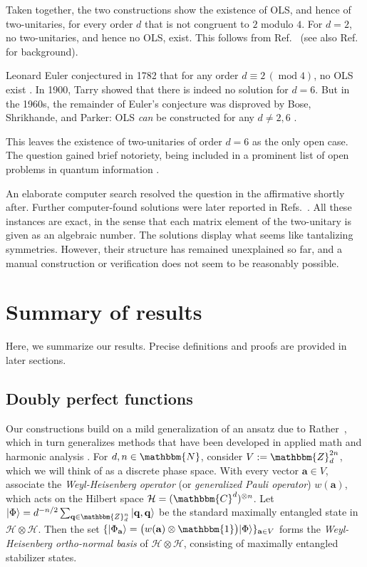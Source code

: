 \documentclass[aps,nofootinbib,floatfix,a4paper]{revtex4}
\newcommand{\1}{\mbox{$\mathbf{1}$}}
\def\ZZ{\mathbbm{Z}}
\def\CC{\mathbbm{C}}
\def\NN{\mathbbm{N}}
\def\H{\mathcal{H}}
\def\Id{\mathbbm{1}}
\renewcommand{\vec}{\mathbf}
\begin{document}
Taken together, the two constructions show the existence of OLS, and hence of two-unitaries, for every order $d$ that is not congruent to $2$ modulo $4$.
For $d=2$, no two-unitaries, and hence no OLS, exist.
This follows from Ref.~\cite{higuchi2000entangled} (see also Ref.~\cite{Goyeneche2015Absolutely} for background).

Leonard Euler conjectured in 1782 that for any order $d\equiv 2\,(\operatorname{mod} 4)$, no OLS exist \cite{colbourn2001mutually}.
In 1900, Tarry showed that there is indeed no solution for $d=6$.
But in the 1960s, the remainder of Euler's conjecture was disproved by Bose, Shrikhande, and Parker:
OLS \emph{can} be constructed for any $d\neq 2,6$
\cite{colbourn2001mutually}.

This leaves the existence of two-unitaries of order $d=6$ as the only open case.
The question gained brief notoriety, being included in a prominent list of open problems in quantum information \cite{horodecki2022five}.

An elaborate computer search 
\cite{rather2022thirty, 
Burchardt2022Symmetry,
zyczkowski2023understanding}
resolved the question in the affirmative shortly after.
Further computer-found solutions were later reported in Refs.~\cite{Rather2024Construction, Bruzda2025Twounitary}.
All these instances are exact, in the sense that each matrix element of the two-unitary is given as an algebraic number.
The solutions display what seems like tantalizing symmetries.
However, their structure has remained unexplained so far, and a manual construction or verification does not seem to be reasonably possible.

\section{Summary of results}

Here, we summarize our results.
Precise definitions and proofs are provided in later sections.

\subsection{Doubly perfect functions}
\label{sec:summary6}

Our constructions build on a mild generalization of an ansatz due to Rather~\cite{Rather2024Construction},
which in turn generalizes methods that have been developed in applied math and harmonic analysis \cite{calabro1967synthesis,bjorck1990functions,fuhr2015biunimodular}.
For $d,n\in\NN$, consider $V:=\ZZ_d^{2n}$, which we will think of as a discrete phase space.
With every vector $\vec a\in V$, associate the \emph{Weyl-Heisenberg operator} (or \emph{generalized Pauli operator}) $w(\vec a)$, which acts on the Hilbert space 
$\H=(\CC^d)^{\otimes n}$.
Let
$|\Phi\rangle=d^{-n/2}\sum_{\vec q\in\ZZ_d^n} |\vec q, \vec q\rangle$ 
be the standard maximally entangled state in 
$\H\otimes\H$.
Then the set $\{|\Phi_{\vec a}\rangle = \big(w(\vec a)\otimes \Id\big)|\Phi\rangle \}_{\vec a \in V}$ forms the \emph{Weyl-Heisenberg ortho-normal basis}
of
$\H\otimes\H$,
consisting of maximally entangled stabilizer states.
\end{document}
